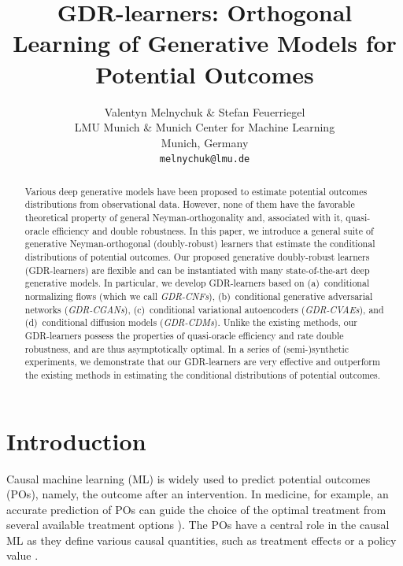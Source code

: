 \documentclass[dvipsnames]{article} %
\title{GDR-learners: Orthogonal Learning of Generative Models for Potential Outcomes}
\author{Valentyn Melnychuk \& Stefan Feuerriegel \\
    LMU Munich \& Munich Center for Machine Learning \\
    Munich, Germany\\
    \texttt{melnychuk@lmu.de} \\
}
\begin{document}
\maketitle

\begin{abstract}
Various deep generative models have been proposed to estimate potential outcomes distributions from observational data. However, none of them have the favorable theoretical property of general Neyman-orthogonality and, associated with it, quasi-oracle efficiency and double robustness. In this paper, we introduce a general suite of generative Neyman-orthogonal (doubly-robust) learners that estimate the conditional distributions of potential outcomes. Our proposed generative doubly-robust learners (GDR-learners) are flexible and can be instantiated with many state-of-the-art deep generative models. In particular, we develop GDR-learners based on (a)~conditional normalizing flows (which we call \emph{GDR-CNFs}), (b)~conditional generative adversarial networks (\emph{GDR-CGANs}), (c)~conditional variational autoencoders (\emph{GDR-CVAEs}), and (d)~conditional diffusion models (\emph{GDR-CDMs}). Unlike the existing methods, our GDR-learners possess the properties of quasi-oracle efficiency and rate double robustness, and are thus asymptotically optimal. In a series of \mbox{(semi-)synthetic} experiments, we demonstrate that our GDR-learners are very effective and outperform the existing methods in estimating the conditional distributions of potential outcomes.  

\end{abstract}

\section{Introduction} 
Causal machine learning (ML) is widely used to predict potential outcomes (POs), namely, the outcome after an intervention. In medicine, for example, an accurate prediction of POs can guide the choice of the optimal treatment from several available treatment options \citep{feuerriegel2024causal}). The POs have a central role in the causal ML as they define various causal quantities, such as treatment effects \citep{curth2021nonparametric} or a policy value \citep{qian2011performance,frauen2025treatment}. 
\end{document}
